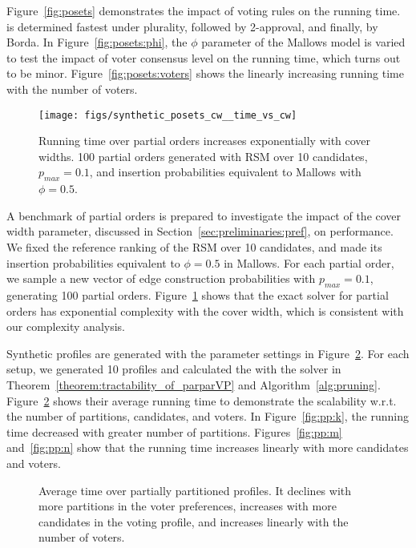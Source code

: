 Figure~\ref{fig:posets} demonstrates the impact of voting rules on the running time.  \mew is determined fastest under plurality, followed by 2-approval, and finally, by Borda.  In Figure~\ref{fig:posets:phi}, the $\phi$ parameter of the Mallows model is varied to test the impact of voter consensus level on the running time, which turns out to be minor. Figure~\ref{fig:posets:voters} shows the linearly increasing running time with the number of voters.

\begin{figure}[b!]
	\centering
	\texttt{[image: figs/synthetic\_posets\_cw\_\_time\_vs\_cw]}
	\caption{Running time over partial orders increases exponentially with cover widths.  100 partial orders generated with RSM over 10 candidates, $p_{max}=0.1$, and insertion probabilities equivalent to Mallows with $\phi=0.5$.}
	\label{fig:cw}
\end{figure}

 A benchmark of partial orders is prepared to investigate the impact of the cover width parameter, discussed in Section~\ref{sec:preliminaries:pref}, on performance. We fixed the reference ranking of the RSM over 10 candidates, and made its insertion probabilities equivalent to $\phi = 0.5$ in Mallows.
For each partial order, we sample a new vector of edge construction probabilities with $p_{max} = 0.1$, generating 100 partial orders.
Figure~\ref{fig:cw} shows that the exact solver for partial orders has exponential complexity with the cover width, which is consistent with our complexity analysis.

 Synthetic profiles are generated with the parameter settings in Figure~\ref{fig:pp}.
For each  setup, we generated 10 profiles and calculated the \mew with the solver in Theorem~\ref{theorem:tractability_of_parparVP} and Algorithm~\ref{alg:pruning}.
Figure~\ref{fig:pp} shows their average running time to demonstrate the scalability w.r.t. the number of partitions, candidates, and voters.
In Figure~\ref{fig:pp:k}, the running time decreased with greater number of partitions.
Figures~\ref{fig:pp:m} and~\ref{fig:pp:n} show that the running time increases linearly with more candidates and voters.

\begin{figure}[tb!]
	\centering
	\hfill
	\hfill
	\hfill
	\caption{Average time over partially partitioned profiles. It declines with more partitions in the voter preferences, increases with more candidates in the voting profile, and increases linearly with the number of voters.}
	\label{fig:pp}
\end{figure}

